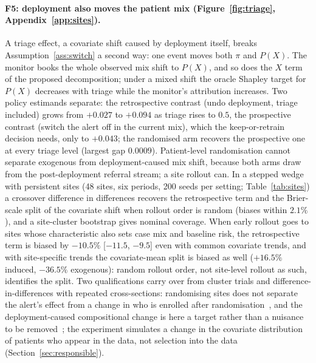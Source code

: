\documentclass[letterpaper]{article} %
\begin{document}
\paragraph{F5: deployment also moves the patient mix
(Figure~\ref{fig:triage}, Appendix~\ref{app:sites}).} A triage effect, a
covariate shift caused by deployment itself, breaks Assumption~\ref{ass:switch}
a second way: one event moves both $\pi$ and $P(X)$. The monitor books the
whole observed mix shift to $P(X)$, and so does the $X$ term of the proposed
decomposition; under a mixed shift the oracle Shapley target for $P(X)$
decreases with triage while the monitor's attribution increases. Two policy
estimands separate: the retrospective contrast (undo deployment, triage
included) grows from $+0.027$ to $+0.094$ as triage rises to $0.5$, the
prospective contrast (switch the alert off in the current mix), which the
keep-or-retrain decision needs, only to $+0.043$; the randomised arm recovers
the prospective one at every triage level (largest gap $0.0009$). Patient-level
randomisation cannot separate exogenous from deployment-caused mix shift,
because both arms draw from the post-deployment referral stream; a site
rollout can. In a stepped wedge with persistent sites (48 sites, six periods,
200 seeds per setting; Table~\ref{tab:sites}) a crossover difference in
differences recovers the retrospective term and the Brier-scale split of the
covariate shift when rollout order is random (biases within $2.1\%$), and a
site-cluster bootstrap gives nominal coverage. When early rollout goes
to sites whose characteristic also sets case mix and baseline risk, the
retrospective term is biased by $-10.5\%$ [$-11.5$, $-9.5$] even with common
covariate trends, and with site-specific trends the covariate-mean split is
biased as well ($+16.5\%$ induced, $-36.5\%$ exogenous): random rollout order, not site-level rollout as such,
identifies the split. Two qualifications carry over from cluster trials and
difference-in-differences with repeated cross-sections: randomising sites
does not separate the alert's effect from a change in who is enrolled after
randomisation~\citep{papadogeorgou2025selection}, and the deployment-caused
compositional change is here a target rather than a nuisance to be
removed~\citep{santanna2026compositional}; the experiment simulates a change
in the covariate distribution of patients who appear in the data, not
selection into the data (Section~\ref{sec:responsible}).
\end{document}
